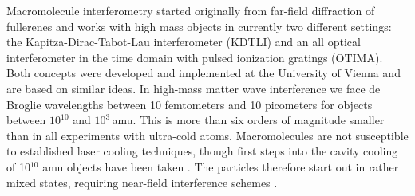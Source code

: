 \documentclass[12pt]{article}
\begin{document}
Macromolecule interferometry started originally from far-field diffraction of fullerenes \cite{Arndt1999}
and works with high mass objects in currently two different settings: the Kapitza-Dirac-Tabot-Lau interferometer (KDTLI)
and an all optical interferometer in the time domain with pulsed ionization gratings (OTIMA).
Both concepts were developed and implemented at the University of Vienna \cite{Gerlich2007,Haslinger2013} and are based on similar ideas.
In high-mass 
matter wave interference we face de Broglie wavelengths between 10 femtometers and 10 picometers for objects between $10^{10}$ and $10^3$\,amu. This is more than six orders of magnitude smaller than in all experiments with ultra-cold atoms. Macromolecules are not susceptible to established laser cooling techniques, though first steps into the cavity cooling of 10$^{10}$ amu objects have been taken \cite{kiesel2013cavity, asenbaum2013cavity}.
The particles therefore start out in rather mixed states, requiring near-field interference schemes \cite{Clauser1997}. 
\end{document}
